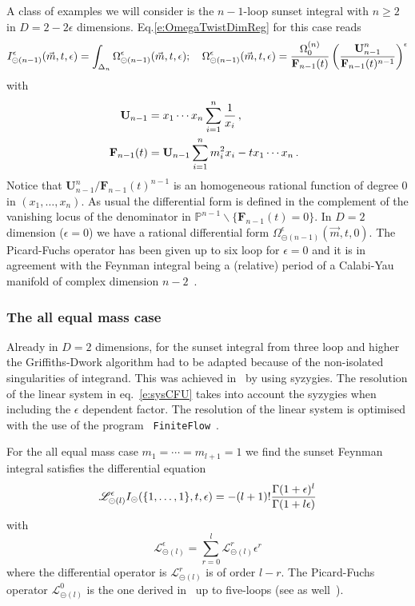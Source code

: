\documentclass[a4paper,12pt]{article}
\numberwithin{equation}{section}
\numberwithin{figure}{section}
\def\su{\circleddash}
\begin{document}
A class of examples we will consider is  
the $n-1$-loop sunset integral with $n\geq2$ in $D=2-2\epsilon$ dimensions. Eq.\eqref{e:OmegaTwistDimReg} for this case reads
\begin{equation}
  I^{\epsilon}_{\su(n-1)}(\vec m,t,\epsilon)= \int_{\Delta_n} \Omega^{\epsilon}_{\su(n-1)}(\vec m,t,\epsilon)  ; \quad
  \Omega^\epsilon_{\su(n-1)}(\vec m, t,\epsilon)={\Omega^{(n)}_0\over
    \textbf{F}_{n-1}(t)}\left(\textbf{U}_{n-1}^n\over \textbf{F}_{n-1}(t)^{n-1}\right)^\epsilon
\end{equation}
with
\begin{align}
  \textbf{ U}_{n-1}&= x_1\cdots x_n\sum_{i=1}^n {1\over x_i}\,, \cr
      \textbf{   F}_{n-1}(t)&= \textbf{U}_{n-1} \sum_{i=1}^n m_i^2x_i-t x_1\cdots x_n \, .
\end{align}
Notice that $\textbf{U}_{n-1}^n/ \textbf{F}_{n-1}(t)^{n-1}$ is an homogeneous
rational function  of degree
0 in $(x_1,\dots,x_n)$. As usual the differential form is defined in
the complement of the vanishing locus of the denominator in $\mathbb P^{n-1}\backslash\{\textbf{F}_{n-1}(t)=0\}$.
In $D=2$ dimension ($\epsilon=0$) we have a rational  differential form
$ \Omega_{\su(n-1)}^{\epsilon}(\vec m,t,0)$. The Picard-Fuchs operator has been
given up to six loop  for $\epsilon=0$ and it is in agreement with the Feynman integral
being a (relative) period of a Calabi-Yau  manifold of complex dimension $n-2$~\cite{Bloch:2013tra,Bloch:2014qca,Bloch:2016izu,Bourjaily:2019hmc,Bonisch:2020qmm,Bonisch:2021yfw,Candelas:2021lkc,Forum:2022lpz}.


   \subsubsection{The all equal mass case}\label{sec:highersunset1mass}
Already in $D=2$ dimensions, for the sunset integral from three loop
and higher  the Griffiths-Dwork algorithm had to be adapted because of
the non-isolated singularities of integrand. This was achieved
in~\cite{Lairez:2022zkj} by using syzygies. The resolution of the
linear system in eq.~\eqref{e:sysCFU} takes into account the syzygies
when including the $\epsilon$ dependent factor.   The resolution of
the linear system is optimised with the use of the program {\tt
  FiniteFlow}~\cite{Peraro:2019svx}.


   
For the all equal mass case $m_1=\cdots =m_{l+1}=1$ we find the sunset
Feynman integral satisfies the differential equation
\begin{equation}
  \mathscr{L}_{\su(l)}^\epsilon I_\su(\{1,\dots,1\},t,\epsilon)=
  -(l+1)! {\Gamma(1+\epsilon)^l\over \Gamma(1+l\epsilon)}
\end{equation}
with
\begin{equation}
  \mathscr{L}_{\su(l)}^{\epsilon} =\sum_{r=0}^{l}  \mathscr{L}_{\su(l)}^{r} \epsilon^r
\end{equation}
where the differential operator is $ \mathscr{L}_{\su(l)}^{r}$ is of
order $l-r$. The Picard-Fuchs operator $ \mathscr{L}_{\su(l)}^{0}$ is
the one derived in~\cite{Vanhove:2014wqa} up to five-loops (see as well~\cite{Bonisch:2020qmm,Pogel:2022yat,Pogel:2022ken,Pogel:2022vat}).
\end{document}
